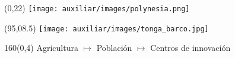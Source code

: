 \documentclass[shownotes,aspectratio=169]{beamer}
\begin{document}
% 
% 
%  
%  
%   


\begin{frame}[plain]
\begin{textblock}{95}(0,22) \centering
\texttt{[image: auxiliar/images/polynesia.png]}  
\end{textblock} 

\begin{textblock}{60}(95,08.5) \centering
\texttt{[image: auxiliar/images/tonga\_barco.jpg]}  
\end{textblock} 

\begin{textblock}{160}(0,4)
\centering \LARGE \textcolor{black!85}{Agricultura $\mapsto$ Población $\mapsto$ Centros de innovación }
\end{textblock}

\end{frame}
\end{document}

